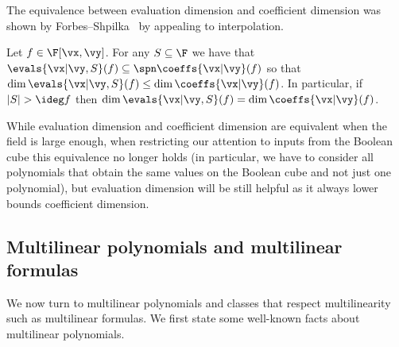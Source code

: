 \documentclass[11pt]{article}
\numberwithin{equation}{section}
\theoremstyle{definition}
\theoremstyle{plain}
\begin{document}
The equivalence between evaluation dimension and coefficient dimension was shown by Forbes--Shpilka~\cite{ForbesShpilka13b} by appealing to interpolation.

\begin{lemmawp}\label{res:evals_eq-coeffs}
   Let $f\in\F[\vx,\vy]$.  For any $S\subseteq\F$ we have that $\evals{\vx|\vy,S}(f)\subseteq\spn \coeffs{\vx|\vy}(f)$ so that $\dim \evals{\vx|\vy,S}(f)\le \dim \coeffs{\vx|\vy}(f)$. In particular, if $|S|>\ideg f$ then $\dim\evals{\vx|\vy,S}(f)=\dim\coeffs{\vx|\vy}(f)$.
\end{lemmawp}

While evaluation dimension and coefficient dimension are equivalent when the field is large enough, when restricting our attention to inputs from the Boolean cube this equivalence no longer holds (in particular, we have to consider all polynomials that obtain the same values on the Boolean cube and not just one polynomial), but evaluation dimension will be still  helpful as it  always lower bounds coefficient dimension.

\subsection{Multilinear polynomials and multilinear formulas}

We now turn to multilinear polynomials and classes that respect multilinearity such as multilinear formulas. We first state some well-known facts about multilinear polynomials.
\end{document}
